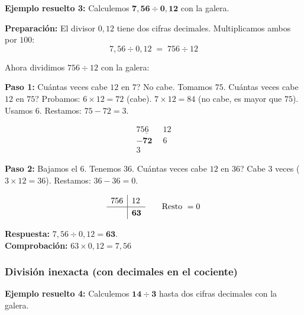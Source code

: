 \documentclass[12pt, letterpaper]{article}
\begin{document}
\noindent\textbf{Ejemplo resuelto 3:} Calculemos $\boldsymbol{7{,}56 \div 0{,}12}$ con la galera.

\begin{cuadrosolucion}
  \textbf{Preparación:} El divisor $0{,}12$ tiene dos cifras decimales. Multiplicamos ambos por $100$:
  \[
    7{,}56 \div 0{,}12 \;=\; 756 \div 12
  \]

  Ahora dividimos $756 \div 12$ con la galera:

  \textbf{Paso 1:} \textquestiondown Cuántas veces cabe $12$ en $7$? No cabe. Tomamos $75$. \textquestiondown Cuántas veces cabe $12$ en $75$? Probamos: $6 \times 12 = 72$ (cabe). $7 \times 12 = 84$ (no cabe, es mayor que $75$). Usamos $6$. Restamos: $75 - 72 = 3$.

  \[
    \renewcommand{\arraystretch}{1.2}
    \begin{array}{r|l}
      75\underline{6}         & 12 \\ \hline
      \mathbf{-72}\phantom{6} & 6  \\
      3\phantom{6}            &
    \end{array}
  \]

  \textbf{Paso 2:} Bajamos el $6$. Tenemos $36$. \textquestiondown Cuántas veces cabe $12$ en $36$? Cabe $3$ veces ($3 \times 12 = 36$). Restamos: $36 - 36 = 0$.

  \[
    \renewcommand{\arraystretch}{1.2}
    \begin{array}{r|l}
      756 & 12              \\ \hline
          & \boldsymbol{63} \\
    \end{array}
    \qquad \text{Resto } = 0
  \]

  \textbf{Respuesta:} $7{,}56 \div 0{,}12 = \boldsymbol{63}$.\\
  \textbf{Comprobación:} $63 \times 0{,}12 = 7{,}56$ \checkmark
\end{cuadrosolucion}

\subsubsection*{División inexacta (con decimales en el cociente)}

\noindent\textbf{Ejemplo resuelto 4:} Calculemos $\boldsymbol{14 \div 3}$ hasta dos cifras decimales con la galera.
\end{document}
